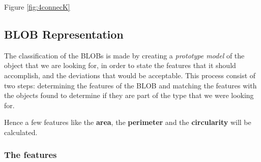 Figure \eqref{fig:4connecK}

\subsection{BLOB Representation}
The classification of the BLOBs is made by creating a \textit{prototype model} of the object that we are looking for, in order to state the features that it should accomplish, and the deviations that would be acceptable. This process consist of two steps: determining the features of the BLOB and matching the features with the objects found to determine if they are part of the type that we were looking for.

Hence a few features like the \textbf{area}, the \textbf{perimeter} and the \textbf{circularity} will be calculated.
\subsubsection{The features}

